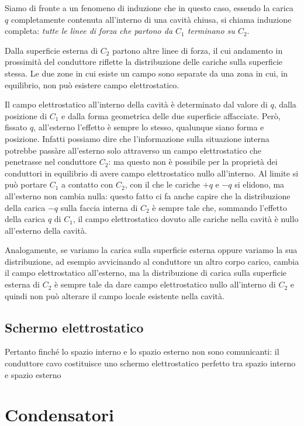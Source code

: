 \documentclass[class=book, crop=false, oneside, 12pt]{standalone}
\begin{document}
Siamo di fronte a un fenomeno di induzione che in questo caso, essendo la carica \(q\) completamente contenuta all'interno di una cavità chiusa, si chiama induzione completa: \emph{tutte le linee di forza che partono da \(C_1\) terminano su \(C_2\)}.

Dalla superficie esterna di \(C_2\) partono altre linee di forza, il cui andamento in prossimità del conduttore riflette la distribuzione delle cariche sulla superficie stessa. 
Le due zone in cui esiste un campo sono separate da una zona in cui, in equilibrio, non può esistere campo elettrostatico. 

Il campo elettrostatico all'interno della cavità è determinato dal valore di \(q\), dalla posizione di \(C_1\) e dalla forma geometrica delle due superficie affacciate. 
Però, fissato \(q\), all'esterno l'effetto è sempre lo stesso, qualunque siano forma e  posizione. 
Infatti possiamo dire che l'informazione sulla situazione interna potrebbe passàre all'esterno solo attraverso un campo elettrostatico che penetrasse nel conduttore \(C_2\): ma questo non è possibile per la proprietà dei conduttori in equilibrio di avere campo elettrostatico nullo all'interno. 
Al limite si può portare \(C_1\) a contatto con \(C_2\), con il che le cariche \(+q\) e \(-q\) si elidono, ma all'esterno non cambia nulla: questo fatto ci fa anche capire che la distribuzione della carica \(-q\) sulla faccia interna di \(C_2\) è sempre tale che, sommando l'effetto della carica \(q\) di \(C_1\), il campo elettrostatico dovuto alle cariche nella cavità è nullo all'esterno della cavità.

Analogamente, se variamo la carica sulla superficie esterna oppure variamo la sua distribuzione, ad esempio avvicinando al conduttore un altro corpo carico, cambia il campo elettrostatico all'esterno, ma la distribuzione di carica sulla superficie esterna di \(C_2\) è sempre tale da dare campo elettrostatico nullo all'interno di \(C_2\) e quindi non può alterare il campo locale esistente nella cavità. 

\subsection{Schermo elettrostatico}

Pertanto finché lo spazio interno e lo spazio esterno non sono comunicanti: il conduttore cavo costituisce uno schermo elettrostatico perfetto tra spazio interno e spazio esterno

\section{Condensatori}
\end{document}
